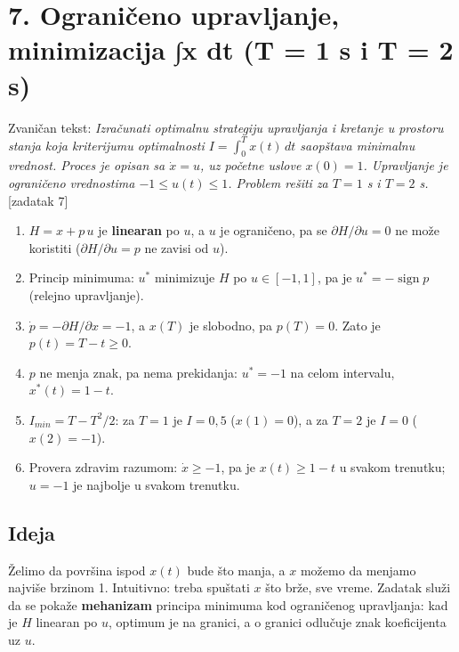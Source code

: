 \documentclass[11pt,a4paper,parskip=half,headsepline,numbers=noenddot]{scrartcl}
\DeclareRobustCommand{\izvor}[1]{{\small\color{izvorC}[#1]}}
\begin{document}
\section{7. Ograničeno upravljanje, minimizacija ∫x dt (T = 1 s i T = 2 s)}

Zvaničan tekst: \emph{Izračunati optimalnu strategiju upravljanja i kretanje u prostoru stanja koja kriterijumu optimalnosti \(I = \int_0^T x(t)\,dt\) saopštava minimalnu vrednost. Proces je opisan sa \(\dot x = u\), uz početne uslove \(x(0) = 1\). Upravljanje je ograničeno vrednostima \(-1 \le u(t) \le 1\). Problem rešiti za \(T = 1\) s i \(T = 2\) s.} \izvor{zadatak 7}

\begin{kljucna}
\begin{enumerate}
\def\labelenumi{\arabic{enumi}.}
\item \(H = x + p\,u\) je \textbf{linearan} po \(u\), a \(u\) je ograničeno, pa se \(\partial H/\partial u = 0\) ne može koristiti (\(\partial H/\partial u = p\) ne zavisi od \(u\)).
\item Princip minimuma: \(u^*\) minimizuje \(H\) po \(u \in [-1, 1]\), pa je \(u^* = -\operatorname{sign} p\) (relejno upravljanje).
\item \(\dot p = -\partial H/\partial x = -1\), a \(x(T)\) je slobodno, pa \(p(T) = 0\). Zato je \(p(t) = T - t \ge 0\).
\item \(p\) ne menja znak, pa nema prekidanja: \(u^* = -1\) na celom intervalu, \(x^*(t) = 1 - t\).
\item \(I_{min} = T - T^2/2\): za \(T = 1\) je \(I = 0{,}5\) (\(x(1) = 0\)), a za \(T = 2\) je \(I = 0\) (\(x(2) = -1\)).
\item Provera zdravim razumom: \(\dot x \ge -1\), pa je \(x(t) \ge 1 - t\) u svakom trenutku; \(u = -1\) je najbolje u svakom trenutku.
\end{enumerate}
\end{kljucna}

\subsection{Ideja}

Želimo da površina ispod \(x(t)\) bude što manja, a \(x\) možemo da menjamo najviše brzinom 1. Intuitivno: treba spuštati \(x\) što brže, sve vreme. Zadatak služi da se pokaže \textbf{mehanizam} principa minimuma kod ograničenog upravljanja: kad je \(H\) linearan po \(u\), optimum je na granici, a o granici odlučuje znak koeficijenta uz \(u\).
\end{document}
